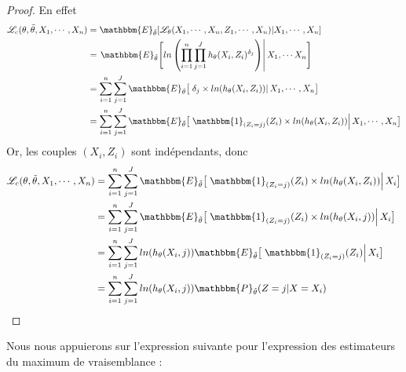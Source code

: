\documentclass[frenchb]{report}
\newcommand{\1}{\mathbbm{1}}
\newcommand{\E}{\mathbbm{E}}
\newcommand{\prob}{\mathbbm{P}}
\newcommand{\lv}{\mathcal{L}}
\newcommand{\thetat}{\tilde{\theta}}
\theoremstyle{definition}\newtheorem{defn}{Définition}
\theoremstyle{definition}\newtheorem{exm}{Exemple}
\theoremstyle{definition}\newtheorem{nota}{Notation}
\theoremstyle{definition}\newtheorem{rem}{Remarque}
\begin{document}
\begin{proof}
En effet
\begin{align*}
\lv_{c}(\theta, \thetat, X_1, \cdots, X_n) &= \E_{\thetat}[\lv_\theta(X_1, \cdots, X_n, Z_1, \cdots, X_n)|X_1, \cdots, X_n]\\
&=\left.  \E_{\thetat}\Bigg[\displaystyle ln\left(\prod_{i=1}^n \prod_{j=1}^J h_\theta(X_i,Z_i)^{\delta_j}\right)  \right| X_1, \cdots X_n \Bigg]\\
&= \displaystyle\sum_{i=1}^n\sum_{j=1}^J  \E_{\thetat}\big[\left.\delta_j\times ln(h_\theta(X_i,Z_i))\right|X_1, \cdots, X_n\big]\\
&= \displaystyle\sum_{i=1}^n\sum_{j=1}^J  \E_{\thetat}\big[\left.\1_{(Z_i=j)}(Z_i)\times ln(h_\theta(X_i,Z_i))\right|X_1, \cdots, X_n\big]\\
\end{align*}
Or, les couples $(X_i, Z_i)$ sont indépendants, donc
\begin{align*}
\lv_{c}(\theta, \thetat, X_1, \cdots, X_n) &= \displaystyle\sum_{i=1}^n\sum_{j=1}^J  \E_{\thetat}\big[\left.\1_{(Z_i=j)}(Z_i)\times ln(h_\theta(X_i,Z_i))\right|X_i\big]\\
&= \displaystyle\sum_{i=1}^n\sum_{j=1}^J  \E_{\thetat}\big[\left.\1_{(Z_i=j)}(Z_i)\times ln(h_\theta(X_i,j))\right|X_i\big]\\
&= \displaystyle\sum_{i=1}^n\sum_{j=1}^Jln(h_\theta(X_i,j))  \E_{\thetat}\big[\left.\1_{(Z_i=j)}(Z_i)\right|X_i\big]\\
&=\displaystyle\sum_{i=1}^n\sum_{j=1}^Jln(h_\theta(X_i,j)) \prob_{\thetat}(Z=j|X=X_i)
\end{align*}
\end{proof}

Nous nous appuierons sur l'expression suivante pour l'expression des estimateurs du maximum de vraisemblance :
\end{document}
